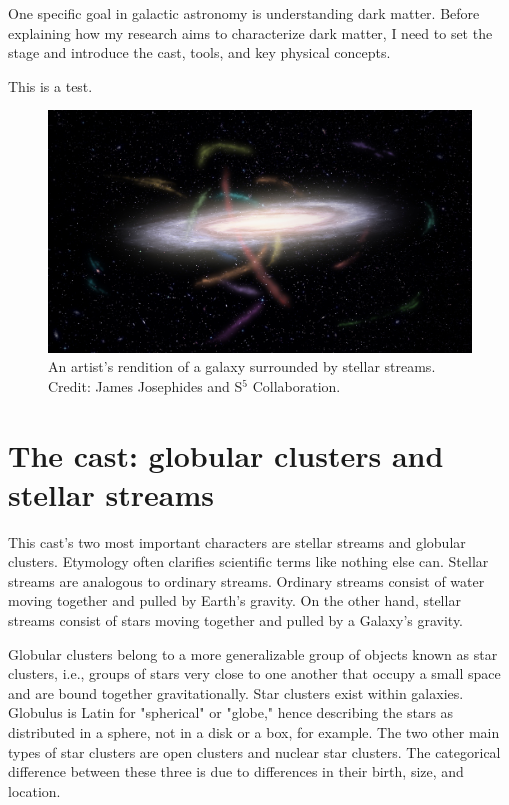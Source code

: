 One specific goal in galactic astronomy is understanding dark matter. Before explaining how my research aims to characterize dark matter, I need to set the stage and introduce the cast, tools, and key physical concepts. 


This is a test. 

\begin{figure}
    \centering
    \includegraphics[width=\linewidth]{images/S5MilkywayStreams.jpg}
    \caption{An artist's rendition of a galaxy surrounded by stellar streams. Credit: James Josephides and S$^5$ Collaboration.}
    \label{fig:S5MilkywayStreams}
\end{figure}


\section{The cast: globular clusters and stellar streams}

This cast's two most important characters are stellar streams and globular clusters. Etymology often clarifies scientific terms like nothing else can. Stellar streams are analogous to ordinary streams. Ordinary streams consist of water moving together and pulled by Earth's gravity. On the other hand, stellar streams consist of stars moving together and pulled by a Galaxy's gravity.

Globular clusters belong to a more generalizable group of objects known as star clusters, i.e., groups of stars very close to one another that occupy a small space and are bound together gravitationally. Star clusters exist within galaxies. Globulus is Latin for "spherical" or "globe," hence describing the stars as distributed in a sphere, not in a disk or a box, for example. The two other main types of star clusters are open clusters and nuclear star clusters. The categorical difference between these three is due to differences in their birth, size, and 
location. 

